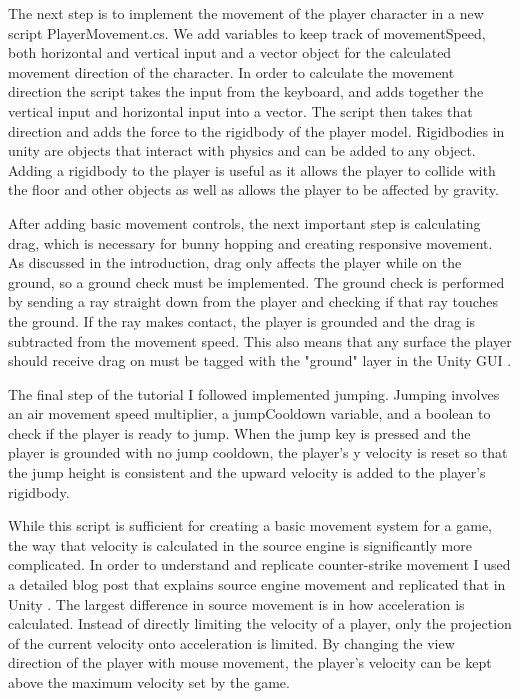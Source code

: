 \documentclass[10pt,twocolumn]{article}
\begin{document}
The next step is to implement the movement of the player character in a new script PlayerMovement.cs. We add variables to keep track of movementSpeed, both horizontal and vertical input and a vector object for the calculated movement direction of the character. In order to calculate the movement direction the script takes the input from the keyboard, and adds together the vertical input and horizontal input into a vector. The script then takes that direction and adds the force to the rigidbody of the player model. Rigidbodies in unity are objects that interact with physics and can be added to any object. Adding a rigidbody to the player is useful as it allows the player to collide with the floor and other objects as well as allows the player to be affected by gravity.

After adding basic movement controls, the next important step is calculating drag, which is necessary for bunny hopping and creating responsive movement. As discussed in the introduction, drag only affects the player while on the ground, so a ground check must be implemented. The ground check is performed by sending a ray straight down from the player and checking if that ray touches the ground. If the ray makes contact, the player is grounded and the drag is subtracted from the movement speed. This also means that any surface the player should receive drag on must be tagged with the "ground" layer in the Unity GUI .

The final step of the tutorial I followed implemented jumping. Jumping involves an air movement speed multiplier, a jumpCooldown variable, and a boolean to check if the player is ready to jump. When the jump key is pressed and the player is grounded with no jump cooldown, the player's y velocity is reset so that the jump height is consistent and the upward velocity is added to the player's rigidbody.

While this script is sufficient for creating a basic movement system for a game, the way that velocity is calculated in the source engine is significantly more complicated. In order to understand and replicate counter-strike movement I used a detailed blog post that explains source engine movement and replicated that in Unity \cite{SourceImplementationBhop}. The largest difference in source movement is in how acceleration is calculated. Instead of directly limiting the velocity of a player, only the projection of the current velocity onto acceleration is limited. By changing the view direction of the player with mouse movement, the player's velocity can be kept above the maximum velocity set by the game.
\end{document}
